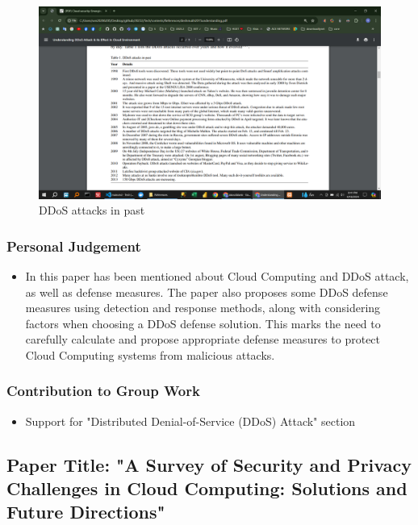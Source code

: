 \documentclass[12pt, twoside]{article}
\begin{document}
\begin{figure}[H]
    \centering
    \includegraphics[scale = 0.15]{DDoS.png}
    \caption{DDoS attacks in past}
\end{figure}



\subsubsection{Personal Judgement}
\begin{itemize}
    \item In this paper has been mentioned about Cloud Computing and DDoS attack, as well as defense measures. The paper also proposes some DDoS defense measures using detection and response methods, along with considering factors when choosing a DDoS defense solution. This marks the need to carefully calculate and propose appropriate defense measures to protect Cloud Computing systems from malicious attacks.
\end{itemize}

\subsubsection{Contribution to Group Work}
\begin{itemize}
    \item Support for "Distributed Denial-of-Service (DDoS) Attack" section
\end{itemize}
\subsection{Paper Title: "A Survey of Security and Privacy Challenges in Cloud Computing: Solutions and Future Directions" \cite{liu2015survey}}
\end{document}
